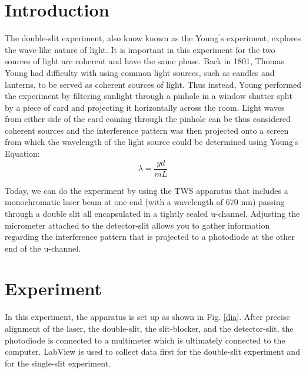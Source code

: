 \documentclass[prb,preprint]{revtex4-1}
\begin{document}
\maketitle 

\section{Introduction}
The double-slit experiment, also know known as the Young$^\prime$s experiment, explores the wave-like nature of light. It is important in this experiment for the two sources of light are coherent and have the same phase. Back in 1801, Thomas Young had difficulty with using common light sources, such as candles and lanterns, to be served as coherent sources of light. Thus instead, Young performed the experiment by filtering sunlight through a pinhole in a window shutter split by a piece of card and projecting it horizontally across the room. Light waves from either side of the card coming through the pinhole can be thus considered coherent sources and the interference pattern was then projected onto a screen from which the wavelength of the light source could be determined using Young$^\prime$s Equation: $$\lambda=\frac{y d}{m L}$$

Today, we can do the experiment by using the TWS apparatus that includes a monochromatic laser beam at one end (with a wavelength of 670 nm) passing through a double slit all encapsulated in a tightly sealed u-channel. Adjusting the micrometer attached to the detector-slit allows you to gather information regarding the interference pattern that is projected to a photodiode at the other end of the u-channel.

\section{Experiment}
In this experiment, the apparatus is set up as shown in Fig. \ref{dia}. After precise alignment of the laser, the double-slit, the slit-blocker, and the detector-slit, the photodiode is connected to a multimeter which is ultimately connected to the computer. LabView is used to collect data first for the double-slit experiment and for the single-slit experiment. \\
\end{document}
